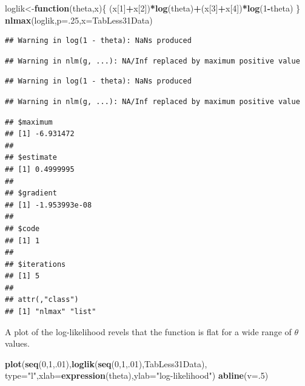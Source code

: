 \documentclass[]{book}
\newenvironment{Shaded}{\begin{snugshade}}{\end{snugshade}}
\newcommand{\KeywordTok}[1]{\textcolor[rgb]{0.13,0.29,0.53}{\textbf{#1}}}
\newcommand{\DataTypeTok}[1]{\textcolor[rgb]{0.13,0.29,0.53}{#1}}
\newcommand{\DecValTok}[1]{\textcolor[rgb]{0.00,0.00,0.81}{#1}}
\newcommand{\StringTok}[1]{\textcolor[rgb]{0.31,0.60,0.02}{#1}}
\newcommand{\ControlFlowTok}[1]{\textcolor[rgb]{0.13,0.29,0.53}{\textbf{#1}}}
\newcommand{\OperatorTok}[1]{\textcolor[rgb]{0.81,0.36,0.00}{\textbf{#1}}}
\newcommand{\NormalTok}[1]{#1}
\theoremstyle{definition}
\theoremstyle{definition}
\theoremstyle{definition}
\theoremstyle{remark}
\begin{document}
\begin{Shaded}
\begin{Highlighting}[]
\NormalTok{loglik<-}\ControlFlowTok{function}\NormalTok{(theta,x)\{}
\NormalTok{    (x[}\DecValTok{1}\NormalTok{]}\OperatorTok{+}\NormalTok{x[}\DecValTok{2}\NormalTok{])}\OperatorTok{*}\KeywordTok{log}\NormalTok{(theta)}\OperatorTok{+}\NormalTok{(x[}\DecValTok{3}\NormalTok{]}\OperatorTok{+}\NormalTok{x[}\DecValTok{4}\NormalTok{])}\OperatorTok{*}\KeywordTok{log}\NormalTok{(}\DecValTok{1}\OperatorTok{-}\NormalTok{theta)}
\NormalTok{\}}
\KeywordTok{nlmax}\NormalTok{(loglik,}\DataTypeTok{p=}\NormalTok{.}\DecValTok{25}\NormalTok{,}\DataTypeTok{x=}\NormalTok{TabLess31Data)}
\end{Highlighting}
\end{Shaded}

\begin{verbatim}
## Warning in log(1 - theta): NaNs produced
\end{verbatim}

\begin{verbatim}
## Warning in nlm(g, ...): NA/Inf replaced by maximum positive value
\end{verbatim}

\begin{verbatim}
## Warning in log(1 - theta): NaNs produced
\end{verbatim}

\begin{verbatim}
## Warning in nlm(g, ...): NA/Inf replaced by maximum positive value
\end{verbatim}

\begin{verbatim}
## $maximum
## [1] -6.931472
## 
## $estimate
## [1] 0.4999995
## 
## $gradient
## [1] -1.953993e-08
## 
## $code
## [1] 1
## 
## $iterations
## [1] 5
## 
## attr(,"class")
## [1] "nlmax" "list"
\end{verbatim}

A plot of the log-likelihood revels that the function is flat for a wide
range of \(\theta\) values.

\begin{Shaded}
\begin{Highlighting}[]
\KeywordTok{plot}\NormalTok{(}\KeywordTok{seq}\NormalTok{(}\DecValTok{0}\NormalTok{,}\DecValTok{1}\NormalTok{,.}\DecValTok{01}\NormalTok{),}\KeywordTok{loglik}\NormalTok{(}\KeywordTok{seq}\NormalTok{(}\DecValTok{0}\NormalTok{,}\DecValTok{1}\NormalTok{,.}\DecValTok{01}\NormalTok{),TabLess31Data),}
     \DataTypeTok{type=}\StringTok{"l"}\NormalTok{,}\DataTypeTok{xlab=}\KeywordTok{expression}\NormalTok{(theta),}\DataTypeTok{ylab=}\StringTok{"log-likelihood"}\NormalTok{)}
\KeywordTok{abline}\NormalTok{(}\DataTypeTok{v=}\NormalTok{.}\DecValTok{5}\NormalTok{)}
\end{Highlighting}
\end{Shaded}
\end{document}
